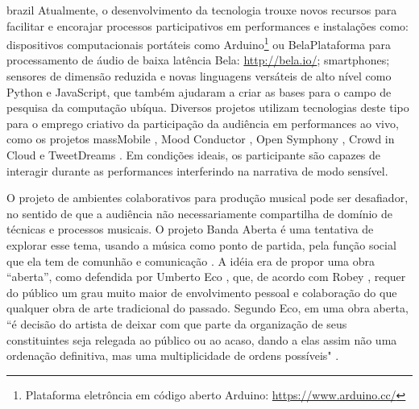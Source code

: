 \begin{otherlanguage*}{brazil}
Atualmente, o desenvolvimento da tecnologia trouxe novos recursos para facilitar e encorajar processos participativos em performances e instalações como: dispositivos computacionais portáteis como Arduino\footnote{Plataforma eletrôncia em código aberto Arduino: \url{https://www.arduino.cc/}} ou Bela{Plataforma para processamento de áudio de baixa latência Bela: \url{http://bela.io/}}; smartphones; sensores de dimensão reduzida e novas linguagens versáteis de alto nível como Python e JavaScript, que também ajudaram a criar as bases para o campo de pesquisa da computação ubíqua. Diversos projetos utilizam tecnologias deste tipo para o emprego criativo da participação da audiência em performances ao vivo, como os projetos massMobile \cite{Weitzner2012}, Mood Conductor \cite{Fazekas:2014}, Open Symphony \cite{wu2017open}, Crowd in Cloud \cite{Lee2016} e TweetDreams \cite{Dahl2011}. Em condições ideais, os participante são capazes de interagir durante as performances interferindo na narrativa de modo sensível. 

O projeto de ambientes colaborativos para produção musical pode ser desafiador, no sentido de que a audiência não necessariamente compartilha de domínio de técnicas e processos musicais. O projeto Banda Aberta é uma tentativa de explorar esse tema, usando a música como ponto de partida, pela função social que ela tem de comunhão e comunicação \cite{Koelsch:2014}. A idéia era de propor uma obra ``aberta'', como defendida por Umberto Eco \cite{Eco1991}, que, de acordo com Robey \cite{Eco1991}, requer do público um grau muito maior de envolvimento pessoal e colaboração do que qualquer obra de arte tradicional do passado. Segundo Eco, em uma obra aberta, ``é decisão do artista de deixar com que parte da organização de seus constituintes seja relegada ao público ou ao acaso, dando a elas assim não uma ordenação definitiva, mas uma multiplicidade de ordens possíveis" \cite{Eco1991}.


\end{otherlanguage*}
